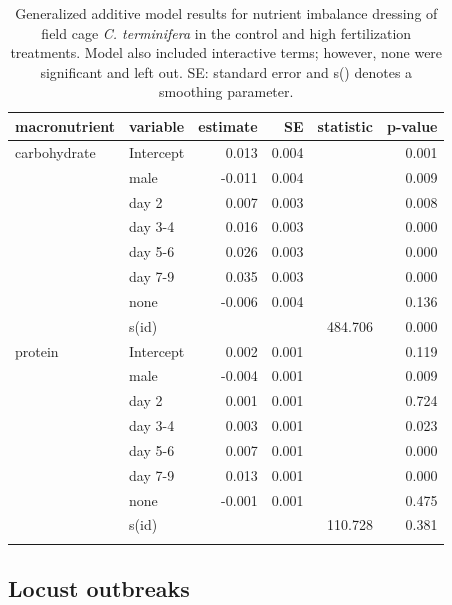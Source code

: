 \documentclass[
]{article}
\begin{document}
\begin{longtable}{llrrrr}

\toprule
macronutrient & variable & estimate & SE & statistic & p-value \\ 
\midrule\addlinespace[2.5pt]
carbohydrate & Intercept & 0.013 & 0.004 &  & 0.001 \\ 
 & male & -0.011 & 0.004 &  & 0.009 \\ 
 & day 2 & 0.007 & 0.003 &  & 0.008 \\ 
 & day 3-4 & 0.016 & 0.003 &  & 0.000 \\ 
 & day 5-6 & 0.026 & 0.003 &  & 0.000 \\ 
 & day 7-9 & 0.035 & 0.003 &  & 0.000 \\ 
 & none & -0.006 & 0.004 &  & 0.136 \\ 
 & s(id) &  &  & 484.706 & 0.000 \\ 
protein & Intercept & 0.002 & 0.001 &  & 0.119 \\ 
 & male & -0.004 & 0.001 &  & 0.009 \\ 
 & day 2 & 0.001 & 0.001 &  & 0.724 \\ 
 & day 3-4 & 0.003 & 0.001 &  & 0.023 \\ 
 & day 5-6 & 0.007 & 0.001 &  & 0.000 \\ 
 & day 7-9 & 0.013 & 0.001 &  & 0.000 \\ 
 & none & -0.001 & 0.001 &  & 0.475 \\ 
 & s(id) &  &  & 110.728 & 0.381 \\ 
\bottomrule

\caption{\label{tbl-field-cage-rebalancing}Generalized additive model
results for nutrient imbalance dressing of field cage \emph{C.
terminifera} in the control and high fertilization treatments. Model
also included interactive terms; however, none were significant and left
out. SE: standard error and s() denotes a smoothing parameter.}

\tabularnewline

\end{longtable}

\endgroup

\subsection{Locust outbreaks}\label{locust-outbreaks}
\end{document}
